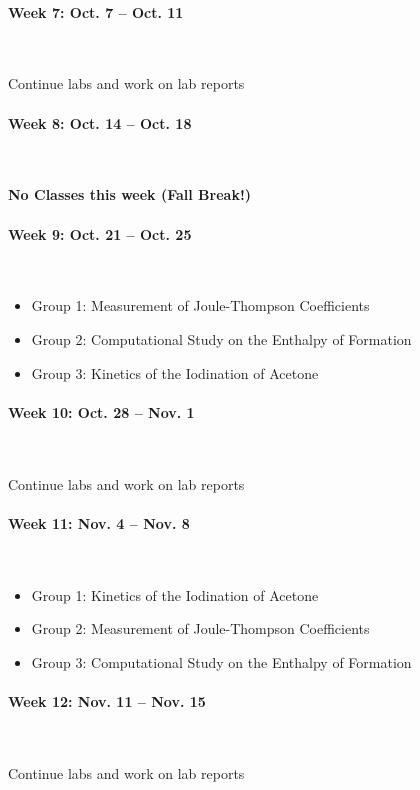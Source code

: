 \documentclass[12pt, letterpaper]{article}
\begin{document}
\paragraph{Week 7: Oct. 7 -- Oct. 11}~

Continue labs and work on lab reports

\paragraph{Week 8: Oct. 14 -- Oct. 18}~

\textbf{No Classes this week (Fall Break!)}

\paragraph{Week 9: Oct. 21 -- Oct. 25}~

\begin{itemize}
  \item Group 1: Measurement of Joule-Thompson Coefficients
  \item Group 2: Computational Study on the Enthalpy of Formation
  \item Group 3: Kinetics of the Iodination of Acetone
\end{itemize}

\paragraph{Week 10: Oct. 28 -- Nov. 1}~

Continue labs and work on lab reports

\paragraph{Week 11: Nov. 4 -- Nov. 8}~

\begin{itemize}
  \item Group 1: Kinetics of the Iodination of Acetone
  \item Group 2: Measurement of Joule-Thompson Coefficients
  \item Group 3: Computational Study on the Enthalpy of Formation
\end{itemize}

\paragraph{Week 12: Nov. 11 -- Nov. 15}~

Continue labs and work on lab reports
\end{document}
